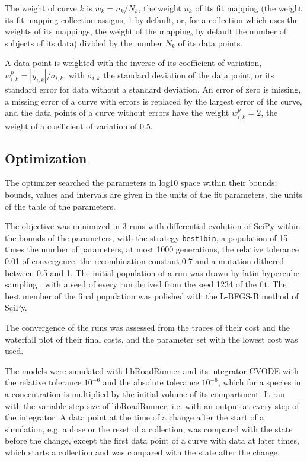 \documentclass{article}
\begin{document}
The weight of curve $k$ is $w_k = n_k / N_k$, the weight $n_k$ of its fit mapping (the weight its fit mapping collection assigns, 1 by default, or, for a collection which uses the weights of its mappings, the weight of the mapping, by default the number of subjects of its data) divided by the number $N_k$ of its data points.

A data point is weighted with the inverse of its coefficient of variation, $w^{p}_{i,k} = |y_{i,k}| / \sigma_{i,k}$, with $\sigma_{i,k}$ the standard deviation of the data point, or its standard error for data without a standard deviation. An error of zero is missing, a missing error of a curve with errors is replaced by the largest error of the curve, and the data points of a curve without errors have the weight $w^{p}_{i,k} = 2$, the weight of a coefficient of variation of 0.5.

\subsection{Optimization}

The optimizer searched the parameters in log10 space within their bounds; bounds, values and intervals are given in the units of the fit parameters, the units of the table of the parameters.

The objective was minimized in 3 runs with differential evolution \cite{Storn1997} of SciPy \cite{Virtanen2020} within the bounds of the parameters, with the strategy \texttt{best1bin}, a population of 15 times the number of parameters, at most 1000 generations, the relative tolerance 0.01 of convergence, the recombination constant 0.7 and a mutation dithered between 0.5 and 1. The initial population of a run was drawn by latin hypercube sampling \cite{McKay1979}, with a seed of every run derived from the seed 1234 of the fit. The best member of the final population was polished with the L-BFGS-B method of SciPy.

The convergence of the runs was assessed from the traces of their cost and the waterfall plot of their final costs, and the parameter set with the lowest cost was used.

The models were simulated with libRoadRunner \cite{Welsh2023} and its integrator CVODE \cite{Hindmarsh2005} with the relative tolerance $10^{-6}$ and the absolute tolerance $10^{-6}$, which for a species in a concentration is multiplied by the initial volume of its compartment. It ran with the variable step size of libRoadRunner, i.e. with an output at every step of the integrator. A data point at the time of a change after the start of a simulation, e.g. a dose or the reset of a collection, was compared with the state before the change, except the first data point of a curve with data at later times, which starts a collection and was compared with the state after the change.
\end{document}
